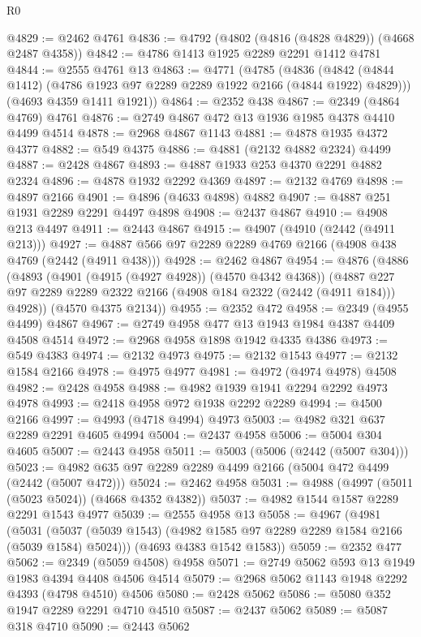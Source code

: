 \begin{lexlean}{R0}
\begin{coremodule}
@4829 := @2462 @4761
@4836 := @4792 (@4802 (@4816 (@4828 @4829)) (@4668 @2487 @4358))
@4842 := @4786 @1413 @1925 @2289 @2291 @1412 @4781
@4844 := @2555 @4761 @13
@4863 := @4771
    (@4785
      (@4836 (@4842 (@4844 @1412) (@4786 @1923 @97 @2289 @2289 @1922 @2166 (@4844 @1922) @4829)))
      (@4693 @4359 @1411 @1921))
@4864 := @2352 @438
@4867 := @2349 (@4864 @4769) @4761
@4876 := @2749 @4867 @472 @13 @1936 @1985 @4378 @4410 @4499 @4514
@4878 := @2968 @4867 @1143
@4881 := @4878 @1935 @4372 @4377
@4882 := @549 @4375
@4886 := @4881 (@2132 @4882 @2324) @4499
@4887 := @2428 @4867
@4893 := @4887 @1933 @253 @4370 @2291 @4882 @2324
@4896 := @4878 @1932 @2292 @4369
@4897 := @2132 @4769
@4898 := @4897 @2166
@4901 := @4896 (@4633 @4898) @4882
@4907 := @4887 @251 @1931 @2289 @2291 @4497 @4898
@4908 := @2437 @4867
@4910 := @4908 @213 @4497
@4911 := @2443 @4867
@4915 := @4907 (@4910 (@2442 (@4911 @213)))
@4927 := @4887 @566 @97 @2289 @2289 @4769 @2166 (@4908 @438 @4769 (@2442 (@4911 @438)))
@4928 := @2462 @4867
@4954 := @4876
    (@4886
      (@4893
        (@4901 (@4915 (@4927 @4928)) (@4570 @4342 @4368))
        (@4887 @227 @97 @2289 @2289 @2322 @2166 (@4908 @184 @2322 (@2442 (@4911 @184))) @4928))
      (@4570 @4375 @2134))
@4955 := @2352 @472
@4958 := @2349 (@4955 @4499) @4867
@4967 := @2749 @4958 @477 @13 @1943 @1984 @4387 @4409 @4508 @4514
@4972 := @2968 @4958 @1898 @1942 @4335 @4386
@4973 := @549 @4383
@4974 := @2132 @4973
@4975 := @2132 @1543
@4977 := @2132 @1584 @2166
@4978 := @4975 @4977
@4981 := @4972 (@4974 @4978) @4508
@4982 := @2428 @4958
@4988 := @4982 @1939 @1941 @2294 @2292 @4973 @4978
@4993 := @2418 @4958 @972 @1938 @2292 @2289
@4994 := @4500 @2166
@4997 := @4993 (@4718 @4994) @4973
@5003 := @4982 @321 @637 @2289 @2291 @4605 @4994
@5004 := @2437 @4958
@5006 := @5004 @304 @4605
@5007 := @2443 @4958
@5011 := @5003 (@5006 (@2442 (@5007 @304)))
@5023 := @4982 @635 @97 @2289 @2289 @4499 @2166 (@5004 @472 @4499 (@2442 (@5007 @472)))
@5024 := @2462 @4958
@5031 := @4988 (@4997 (@5011 (@5023 @5024)) (@4668 @4352 @4382))
@5037 := @4982 @1544 @1587 @2289 @2291 @1543 @4977
@5039 := @2555 @4958 @13
@5058 := @4967
    (@4981
      (@5031 (@5037 (@5039 @1543) (@4982 @1585 @97 @2289 @2289 @1584 @2166 (@5039 @1584) @5024)))
      (@4693 @4383 @1542 @1583))
@5059 := @2352 @477
@5062 := @2349 (@5059 @4508) @4958
@5071 := @2749 @5062 @593 @13 @1949 @1983 @4394 @4408 @4506 @4514
@5079 := @2968 @5062 @1143 @1948 @2292 @4393 (@4798 @4510) @4506
@5080 := @2428 @5062
@5086 := @5080 @352 @1947 @2289 @2291 @4710 @4510
@5087 := @2437 @5062
@5089 := @5087 @318 @4710
@5090 := @2443 @5062

\end{coremodule}
\end{lexlean}

